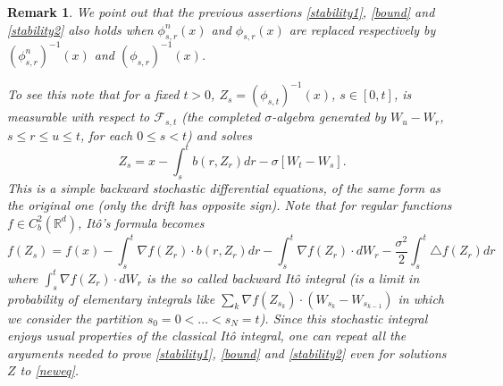 \documentclass{article}
\newtheorem{remark}[theorem]{Remark}
\begin{document}
\begin{remark}
\label{inverse} \emph{We point out that the previous assertions
\eqref{stability1}, \eqref{bound} and \eqref{stability2} also holds when
$\phi_{s,r}^{n}(x)$ and $\phi_{s,r}(x)$ are replaced respectively by
$(\phi_{s,r}^{n})^{-1}(x)$ and $(\phi_{s,r})^{-1}(x)$. }

\emph{To see this note that for a fixed $t>0$, $Z_{s} = (\phi_{s,t})^{-1}(x)
$, $s \in[0,t]$, is measurable with respect to  $\mathcal{F}_{s,t}$ (the
completed $\sigma$-algebra generated by $W_{u}-W_{r}$, $s\leq r\leq u\leq t$,
for each $0\le s<t$) and solves
\begin{equation}
\label{neweq}Z_{s}=x-\int_{s}^{t}b(r, Z_{r})dr - \sigma[W_{t}-W_{s}].
\end{equation}
This is a simple backward stochastic differential equations, of the same form
as the original one (only the drift has opposite sign).  Note that for
regular
functions $f \in C^{2}_{b}(\mathbb{R}^{d})$, It\^o's formula becomes
\[
f(Z_{s}) = f(x) - \int_{s}^{t} \nabla f(Z_{r})
\cdot b(r, Z_{r})dr  - \int%
_{s}^{t} \nabla f (Z_{r}) \cdot dW_{r} -  \frac{\sigma^{2}}{2}
\int_{s}^{t} \triangle f ( Z_{r})dr
\]
where $\int_{s}^{t} \nabla f (Z_{r}) \cdot dW_{r}$ is the so called
backward It\^o integral (is a limit in probability of elementary
integrals like $\sum_{k} \nabla f (Z_{s_{k}}) \cdot(W_{s_{k}}-
W_{s_{k-1}})$ in which we consider the partition $s_{0}=0 < \ldots<
s_{N} =t$). Since this stochastic integral enjoys usual properties
of the classical It\^o  integral, one can repeat all the arguments
needed to prove \eqref{stability1}, \eqref{bound} and
\eqref{stability2} even for solutions $Z$ to \eqref{neweq}. }
\end{remark}
\end{document}
